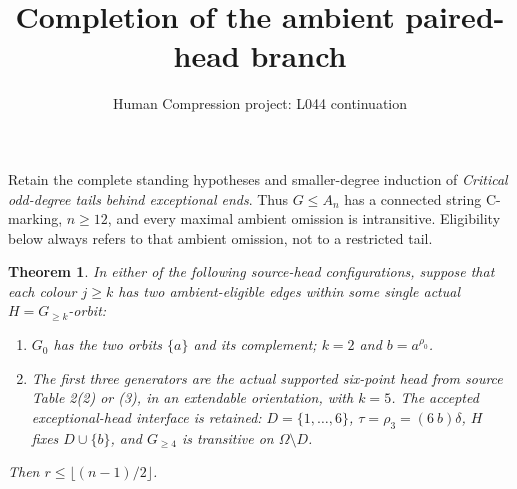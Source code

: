 \documentclass[11pt,a4paper]{article}
\title{Completion of the ambient paired-head branch}
\author{Human Compression project: L044 continuation}
\date{}
\newtheorem{theorem}{Theorem}
\begin{document}
\maketitle
Retain the complete standing hypotheses and smaller-degree induction
of \emph{Critical odd-degree tails behind exceptional ends}.
Thus $G\le A_n$ has a connected string C-marking, $n\ge12$,
and every maximal ambient omission is intransitive. Eligibility below
always refers to that ambient omission, not to a restricted tail.

\begin{theorem}
In either of the following source-head configurations, suppose that
each colour $j\ge k$ has two ambient-eligible edges within some
single actual $H=G_{\ge k}$-orbit:
\begin{enumerate}
\item $G_0$ has the two orbits $\{a\}$ and its complement;
$k=2$ and $b=a^{\rho_0}$.
\item The first three generators are the actual supported six-point
head from source Table 2(2) or (3), in an extendable orientation,
with $k=5$. The accepted exceptional-head interface is retained:
$D=\{1,\ldots,6\}$, $\tau=\rho_3=(6\ b)\delta$,
$H$ fixes $D\cup\{b\}$, and $G_{\ge4}$ is transitive on
$\Omega\setminus D$.
\end{enumerate}
Then $r\le\lfloor(n-1)/2\rfloor$.
\end{theorem}
\end{document}
